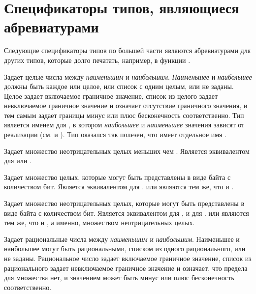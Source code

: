 \section{Спецификаторы типов, являющиеся абревиатурами}

Следующие спецификаторы типов по большей части являются абревиатурами для других
типов, которые долго печатать, например, в функции .
\begin{flushdesc}

\item[\cd{(integer \emph{наименьшее} \emph{наибольшее})}]
Задает целые числа между \emph{наименьшим} и
\emph{наибольшим}. \emph{Наименьшее} и \emph{наибольшее} должны быть
каждое или целое, или список с одним целым, или не заданы.
Целое задает включаемое граничное значение, список из целого задает невключаемое
граничное значение и \cdf{*} означает отсутствие граничного значения, и тем самым
задает границы минус или плюс бесконечность соответственно.
Тип  является именем для , в котором \emph{наибольшее} и \emph{наименьшее}
значения зависят от реализации (см.  и
).
Тип  оказался так полезен, что имеет отдельное имя .

\item[\cd{(mod \emph{n})}]
Задает множество неотрицательных целых меньших чем . Является эквивалентом
для  или .

\item[\cd{(signed-byte \emph{s})}]
Задает множество целых, которые могут быть представлены в виде байта с 
количеством бит. Является эквивалентом для .
 или  являются тем же, что и .

\item[\cd{(unsigned-byte \emph{s})}]
Задает множество неотрицательных целых, которые могут быть представлены в виде байта с 
количеством бит. Является эквивалентом для , и для .
 или  являются тем же, что и
, а именно, множеством неотрицательных целых.

\item[\cd{(rational \emph{наименьшее} \emph{наибольшее})}]
Задает рациональные числа между \emph{наименьшим} и
\emph{наибольшим}. Наименьшее и наибольшее могут быть рациональными, списком
из одного рационального, или не заданы.
Рациональное число задает включаемое граничное значение, список из
рационального задает невключаемое граничное значение и \cdf{*} означает, что
предела для множества нет, и значением может быть минус или плюс бесконечность соответственно.


\end{flushdesc}

